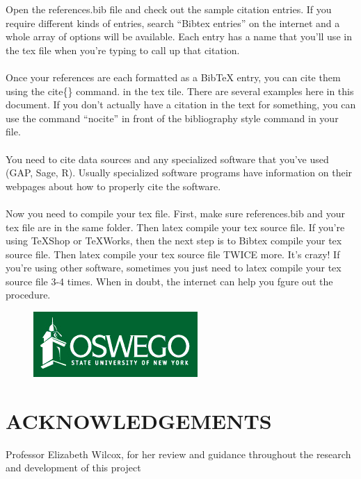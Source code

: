 \documentclass[landscape]{sciposter}
\begin{document}
\begin{multicols}{4}
Open the references.bib file and check out the sample citation entries.  If you require different kinds of entries, search ``Bibtex entries'' on the internet and a whole array of options will be available.  Each entry has a name that you'll use in the tex file when you're typing to call up that citation.
\\
\\
Once your references are each formatted as a BibTeX entry, you can cite them using the cite\{\} command.  in the tex tile.  There are several examples here in this document.  If you don't actually have a citation in the text for something, you can use the command ``nocite'' in front of the bibliography style command in your file.  
\\
\\
You need to cite data sources and any specialized software that you've used (GAP, Sage, R).  Usually specialized software programs have information on their webpages about how to properly cite the software.  
\\
\\
Now you need to compile your tex file.  First, make sure references.bib and your tex file are in the same folder.  Then latex compile your tex source file.  If you're using TeXShop or TeXWorks, then the next step is to Bibtex compile your tex source file.  Then latex compile your tex source file TWICE more.  It's crazy!  If you're using other software, sometimes you just need to latex compile your tex source file 3-4 times.  When in doubt, the internet can help you fgure out the procedure.

\begin{figure}
\centering
\includegraphics[scale = 2.0]{oswegologo}
\end{figure}



\section{ACKNOWLEDGEMENTS}

Professor Elizabeth Wilcox, for her review and guidance throughout the research and development of this project


\nocite{WinNT}
\nocite{GAP4}



\end{multicols}

\section*{ }
\end{document}

